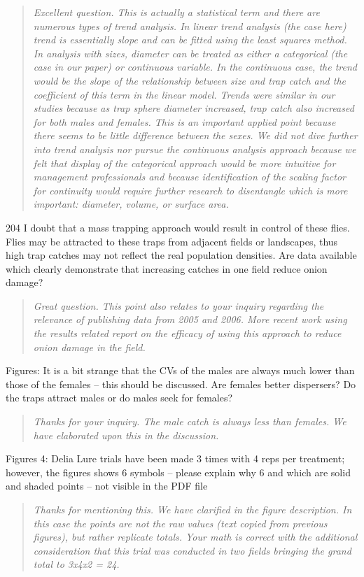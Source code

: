 \documentclass{article}
\begin{document}
\begin{quote}
    \textit{Excellent question.  This is actually a statistical term and there are numerous types of trend analysis.  In linear trend analysis (the case here) trend is essentially slope and can be fitted using the least squares method.  In analysis with sizes, diameter can be treated as either a categorical (the case in our paper) or continuous variable.  In the continuous case, the trend would be the slope of the relationship between size and trap catch and the coefficient of this term in the linear model.  Trends were similar in our studies because as trap sphere diameter increased, trap catch also increased for both males and females.  This is an important applied point because there seems to be little difference between the sexes.  We did not dive further into trend analysis nor pursue the continuous analysis approach because we felt that display of the categorical approach would be more intuitive for management professionals and because identification of the scaling factor for continuity would require further research to disentangle which is more important: diameter, volume, or surface area.  
    }
\end{quote}


204 I doubt that a mass trapping approach would result in control of these flies. Flies may be attracted to these traps from adjacent fields or landscapes, thus high trap catches may not reflect the real population densities. Are data available which clearly demonstrate that increasing catches in one field reduce onion damage?

\begin{quote}
    \textit{Great question.  This point also relates to your inquiry regarding the relevance of publishing data from 2005 and 2006.  More recent work using the results related report on the efficacy of using this approach to reduce onion damage in the field.  }
\end{quote}

Figures: It is a bit strange that the CVs of the males are always much lower than those of the females – this should be discussed. Are females better dispersers? Do the traps attract males or do males seek for females?

\begin{quote}
    \textit{Thanks for your inquiry.  The male catch is always less than females.  We have elaborated upon this in the discussion.  }
\end{quote}

Figures 4: Delia Lure trials have been made 3 times with 4 reps per treatment; however, the figures shows 6 symbols – please explain why 6 and which are solid and shaded points – not visible in the PDF file

\begin{quote}
    \textit{Thanks for mentioning this.  We have clarified in the figure description.  In this case the points are not the raw values (text copied from previous figures), but rather replicate totals.  Your math is correct with the additional consideration that this trial was conducted in two fields bringing the grand total to 3x4x2 = 24.  }
\end{quote}
\end{document}
